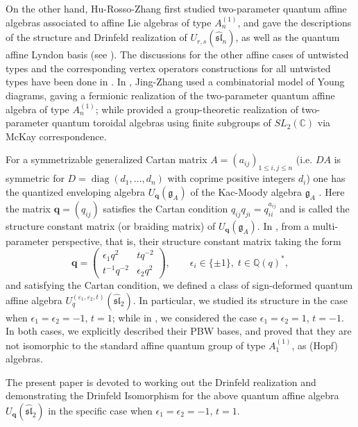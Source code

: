 \documentclass[12pt]{amsart}
\numberwithin{equation}{section}
\numberwithin{equation}{section}
\begin{document}
On the other hand, Hu-Rosso-Zhang first studied two-parameter quantum affine algebras associated to affine Lie algebras of type \(A_n^{(1)}\), and gave the descriptions of the structure and Drinfeld realization of \(U_{r, s}(\widehat{\mathfrak{sl}}_n)\), as well as the quantum affine Lyndon basis (see \cite{8}). The discussions for the other affine cases of untwisted types and the corresponding vertex operators constructions for all untwisted types have been done in \cite{HZ,Z}. In \cite{JZ1}, Jing-Zhang used a combinatorial model of Young diagrams, gaving a fermionic realization of the two-parameter quantum affine algebra of type \(A_n^{(1)}\); while \cite{JZ2} provided a group-theoretic realization of two-parameter quantum toroidal algebras using finite subgroups of \(SL_2(\mathbb{C})\) via McKay correspondence.

For a symmetrizable generalized Cartan matrix \(A=(a_{ij})_{1\le i,j\le n}\) (i.e. \(DA\) is symmetric for \(D=\operatorname{diag}(d_1,\dots ,d_n)\) with coprime positive integers \(d_i\)) one has the quantized enveloping algebra \(U_{\mathbf q}(\mathfrak g_A)\) of the Kac-Moody algebra \(\mathfrak g_A\) \cite{PHR}. Here the matrix \(\mathbf q=(q_{ij})\) satisfies the Cartan condition \(q_{ij}q_{ji}=q_{ii}^{a_{ij}}\) and is called the structure constant matrix (or braiding matrix) of \(U_{\mathbf q}(\mathfrak g_A)\).  
In \cite{HZhuang},  from a multi-parameter perspective, that is, their structure constant matrix taking the form \[ \mathbf q=\begin{pmatrix} \epsilon_1 q^{2} & t q^{-2}\\[2pt] t^{-1}q^{-2} & \epsilon_2 q^{2} \end{pmatrix},\qquad  \epsilon_i\in\{\pm1\},\; t\in\mathbb Q(q)^*, \] and satisfying the Cartan condition, we defined a class of sign-deformed quantum affine algebra \(U^{(\varepsilon_1,\varepsilon_2,t)}_q(\widehat{\mathfrak{sl}}_2)\). In particular, we studied its structure in the case when \(\epsilon_1=\epsilon_2=-1\), \(t=1\); while in \cite{FHZ}, we considered the  case \(\epsilon_1=\epsilon_2=1\), \(t=-1\). In both cases, we explicitly described their PBW bases, and proved that they are not isomorphic to the standard affine quantum group of type \(A_1^{(1)}\), as (Hopf) algebras.


The present paper is devoted to working out the Drinfeld realization and demonstrating the Drinfeld Isomorphism for the above quantum affine algebra \(U_{\mathbf q}(\widehat{\mathfrak{sl}}_2)\) in the specific case when \(\epsilon_1=\epsilon_2=-1\), \(t=1\).
\end{document}

